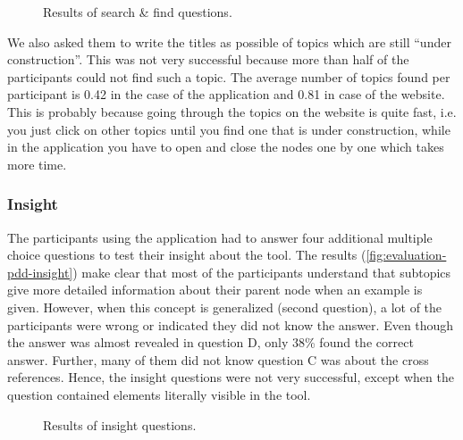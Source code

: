 \begin{figure}[H]
	\centering
	\caption{Results of search \& find questions.}
	\label{fig:evaluation-pdd-search-find}
\end{figure}

We also asked them to write the titles as possible of topics which are still ``under construction''. This was not very successful because more than half of the participants could not find such a topic. The average number of topics found per participant is 0.42 in the case of the application and 0.81 in case of the website. This is probably because going through the topics on the website is quite fast, i.e. you just click on other topics until you find one that is under construction, while in the application you have to open and close the nodes one by one which takes more time.

\subsubsection{Insight}
The participants using the application had to answer four additional multiple choice questions to test their insight about the tool. The results (\autoref{fig:evaluation-pdd-insight}) make clear that most of the participants understand that subtopics give more detailed information about their parent node when an example is given. However, when this concept is generalized (second question), a lot of the participants were wrong or indicated they did not know the answer. Even though the answer was almost revealed in question D, only 38\% found the correct answer. Further, many of them did not know question C was about the cross references. Hence, the insight questions were not very successful, except when the question contained elements literally visible in the tool.

\begin{figure}[H]
	\centering
	\caption{Results of insight questions.}
	\label{fig:evaluation-pdd-insight}
\end{figure}




%	
%	

